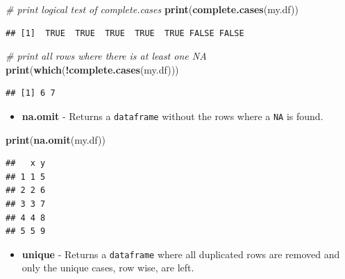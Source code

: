 \documentclass[11pt,]{book}
\newenvironment{Shaded}{\begin{snugshade}}{\end{snugshade}}
\newcommand{\KeywordTok}[1]{\textcolor[rgb]{0.27,0.27,0.27}{\textbf{#1}}}
\newcommand{\CommentTok}[1]{\textcolor[rgb]{0.56,0.35,0.01}{\textit{#1}}}
\newcommand{\OperatorTok}[1]{\textcolor[rgb]{0.81,0.36,0.00}{\textbf{#1}}}
\newcommand{\NormalTok}[1]{#1}
\providecommand{\tightlist}{%
  \setlength{\itemsep}{0pt}\setlength{\parskip}{0pt}}
\begin{document}
\begin{Shaded}
\begin{Highlighting}[]
\CommentTok{# print logical test of complete.cases}
\KeywordTok{print}\NormalTok{(}\KeywordTok{complete.cases}\NormalTok{(my.df))}
\end{Highlighting}
\end{Shaded}

\begin{verbatim}
## [1]  TRUE  TRUE  TRUE  TRUE  TRUE FALSE FALSE
\end{verbatim}

\begin{Shaded}
\begin{Highlighting}[]
\CommentTok{# print all rows where there is at least one NA}
\KeywordTok{print}\NormalTok{(}\KeywordTok{which}\NormalTok{(}\OperatorTok{!}\KeywordTok{complete.cases}\NormalTok{(my.df)))}
\end{Highlighting}
\end{Shaded}

\begin{verbatim}
## [1] 6 7
\end{verbatim}

\begin{itemize}
\tightlist
\item
  \textbf{na.omit} - Returns a \texttt{dataframe} without the rows where
  a \texttt{NA} is found. 
\end{itemize}

\begin{Shaded}
\begin{Highlighting}[]
\KeywordTok{print}\NormalTok{(}\KeywordTok{na.omit}\NormalTok{(my.df))}
\end{Highlighting}
\end{Shaded}

\begin{verbatim}
##   x y
## 1 1 5
## 2 2 6
## 3 3 7
## 4 4 8
## 5 5 9
\end{verbatim}

\begin{itemize}
\tightlist
\item
  \textbf{unique} - Returns a \texttt{dataframe} where all duplicated
  rows are removed and only the unique cases, row wise, are left.
\end{itemize}
\end{document}
